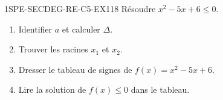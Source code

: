 


\begin{exercice}{1SPE-SECDEG-RE-C5-EX1}{1}{8}
Résoudre $x^2 - 5x + 6 \leq 0$.
\begin{enumerate}
  \item Identifier $a$ et calculer $\Delta$.
  \item Trouver les racines $x_1$ et $x_2$.
  \item Dresser le tableau de signes de $f(x) = x^2 - 5x + 6$.
  \item Lire la solution de $f(x) \leq 0$ dans le tableau.
\end{enumerate}
\end{exercice}


